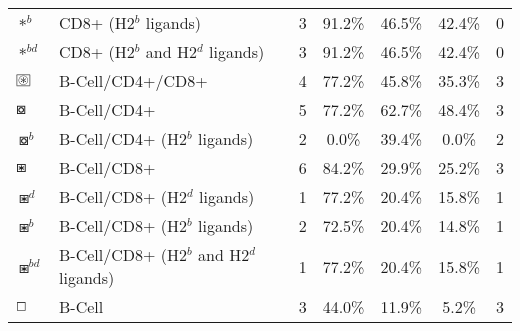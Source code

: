 \begin{tabular}{llccccc}
                                          $ \ast^b $ &                    CD8+ (H2$^b$ ligands) &            3 &         91.2\% &          46.5\% &         42.4\% &                          0 \\
                                       $ \ast^{bd} $ &         CD8+ (H2$^b$ and H2$^d$ ligands) &            3 &         91.2\% &          46.5\% &         42.4\% &                          0 \\
 $ \setlength{\fboxsep}{0.5pt} \boxed{\circledast} $ &                         B-Cell/CD4+/CD8+ &            4 &         77.2\% &          45.8\% &         35.3\% &                          3 \\
                                      $ \boxcircle $ &                              B-Cell/CD4+ &            5 &         77.2\% &          62.7\% &         48.4\% &                          3 \\
                                    $ \boxcircle^b $ &             B-Cell/CD4+ (H2$^b$ ligands) &            2 &          0.0\% &          39.4\% &          0.0\% &                          2 \\
                                         $ \boxast $ &                              B-Cell/CD8+ &            6 &         84.2\% &          29.9\% &         25.2\% &                          3 \\
                                       $ \boxast^d $ &             B-Cell/CD8+ (H2$^d$ ligands) &            1 &         77.2\% &          20.4\% &         15.8\% &                          1 \\
                                       $ \boxast^b $ &             B-Cell/CD8+ (H2$^b$ ligands) &            2 &         72.5\% &          20.4\% &         14.8\% &                          1 \\
                                    $ \boxast^{bd} $ &  B-Cell/CD8+ (H2$^b$ and H2$^d$ ligands) &            1 &         77.2\% &          20.4\% &         15.8\% &                          1 \\
                                       $ \boxempty $ &                                   B-Cell &            3 &         44.0\% &          11.9\% &          5.2\% &                          3 \\
\bottomrule
\end{tabular}
